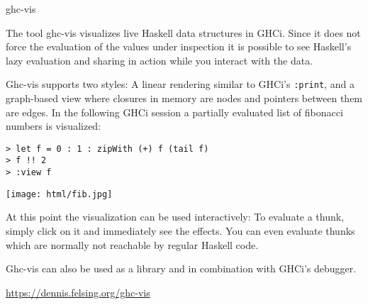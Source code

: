 \begin{hcarentry}{ghc-vis}
\label{ghc-vis}
\makeheader

The tool ghc-vis visualizes live Haskell data structures in GHCi.
Since it does not force the evaluation of the values under inspection it is possible to see Haskell's lazy evaluation and sharing in action while you interact with the data.

Ghc-vis supports two styles: A linear rendering similar to GHCi's \texttt{:print}, and a graph-based view where closures in memory are nodes and pointers between them are edges.
In the following GHCi session a partially evaluated list of fibonacci numbers is visualized:

\begin{verbatim}
> let f = 0 : 1 : zipWith (+) f (tail f)
> f !! 2
> :view f
\end{verbatim}

\begin{center}
\texttt{[image: html/fib.jpg]}
\end{center}

At this point the visualization can be used interactively: To evaluate a thunk, simply click on it and immediately see the effects. You can even evaluate thunks which are normally not reachable by regular Haskell code.

Ghc-vis can also be used as a library and in combination with GHCi's debugger.

\FurtherReading
  \url{https://dennis.felsing.org/ghc-vis}
\end{hcarentry}
